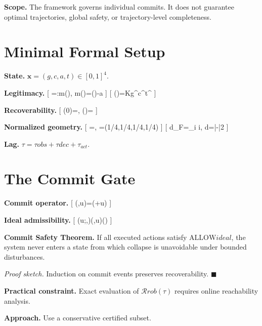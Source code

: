 \documentclass{article}
\begin{document}
\textbf{Scope.} The framework governs individual commits. It does not guarantee optimal trajectories, global safety, or trajectory-level completeness.

\section{Minimal Formal Setup}

\textbf{State.} $\mathbf{x}=(g,c,a,t)\in[0,1]^4$.

\textbf{Legitimacy.}
[
={:m()}, \quad m()=\Lambda()-a
]
[
\Lambda()=Kg^\alpha c^\beta t^\gamma
]

\textbf{Recoverability.}
[
(0)={}, \quad
{}(\tau)={\tau}
]

\textbf{Normalized geometry.}
[
=, \quad {}=(1/4,1/4,1/4,1/4)
]
[
d_F=\min_i i, \quad d\Delta=|-|2
]

\textbf{Lag.} $\tau=\tau{obs}+\tau{dec}+\tau_{act}$.

\section{The Commit Gate}

\textbf{Commit operator.}
[
\Phi(,u)=(+u)
]

\textbf{Ideal admissibility.}
[
(u;,\tau)\Leftrightarrow\Phi(,u)\in{}(\tau)
]

\textbf{Commit Safety Theorem.}
If all executed actions satisfy $\text{ALLOW}{ideal}$, the system never enters a state from which collapse is unavoidable under bounded disturbances.

\textit{Proof sketch.} Induction on commit events preserves recoverability. \hfill $\blacksquare$

\textbf{Practical constraint.}
Exact evaluation of $\mathcal{R}{rob}(\tau)$ requires online reachability analysis.

\textbf{Approach.}
Use a conservative certified subset.

\end{document}
